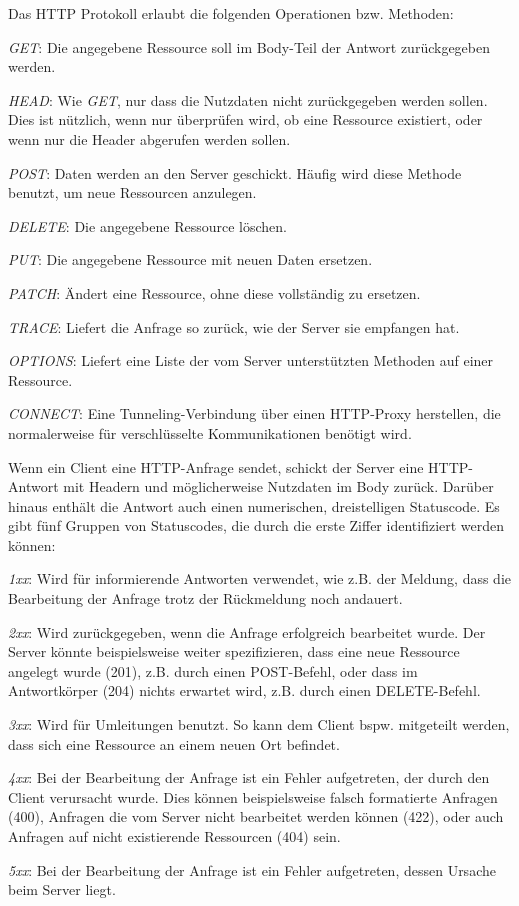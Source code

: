 Das HTTP Protokoll erlaubt die folgenden Operationen bzw. Methoden:

\begin{description}
	\item \emph{GET}: Die angegebene Ressource soll im Body-Teil der Antwort zurückgegeben werden.
	\item \emph{HEAD}: Wie \emph{GET}, nur dass die Nutzdaten nicht zurückgegeben werden sollen. Dies ist nützlich, wenn nur überprüfen wird, ob eine Ressource existiert, oder wenn nur die Header abgerufen werden sollen.
	\item \emph{POST}: Daten werden an den Server geschickt. Häufig wird diese Methode benutzt, um neue Ressourcen anzulegen.
	\item \emph{DELETE}: Die angegebene Ressource löschen.
	\item \emph{PUT}: Die angegebene Ressource mit neuen Daten ersetzen.
	\item \emph{PATCH}: Ändert eine Ressource, ohne diese vollständig zu ersetzen.
	\item \emph{TRACE}: Liefert die Anfrage so zurück, wie der Server sie empfangen hat.
	\item \emph{OPTIONS}: Liefert eine Liste der vom Server unterstützten Methoden auf einer Ressource.
	\item \emph{CONNECT}: Eine Tunneling-Verbindung über einen HTTP-Proxy herstellen, die normalerweise für verschlüsselte Kommunikationen benötigt wird.
\end{description}

Wenn ein Client eine HTTP-Anfrage sendet, schickt der Server eine HTTP-Antwort mit Headern und möglicherweise Nutzdaten im Body zurück. Darüber hinaus enthält die Antwort auch einen numerischen, dreistelligen Statuscode. Es gibt fünf Gruppen von Statuscodes, die durch die erste Ziffer identifiziert werden können:

\begin{description}
	\item \emph{1xx}: Wird für informierende Antworten verwendet, wie z.B. der Meldung, dass die Bearbeitung der Anfrage trotz der Rückmeldung noch andauert.
	\item \emph{2xx}: Wird zurückgegeben, wenn die Anfrage erfolgreich bearbeitet wurde. Der Server könnte beispielsweise weiter spezifizieren, dass eine neue Ressource angelegt wurde (201), z.B. durch einen POST-Befehl, oder dass im Antwortkörper (204) nichts erwartet wird, z.B. durch einen DELETE-Befehl.
	\item \emph{3xx}: Wird für Umleitungen benutzt. So kann dem Client bspw. mitgeteilt werden, dass sich eine Ressource an einem neuen Ort befindet.
	\item \emph{4xx}: Bei der Bearbeitung der Anfrage ist ein Fehler aufgetreten, der durch den Client verursacht wurde. Dies können beispielsweise falsch formatierte Anfragen (400), Anfragen die vom Server nicht bearbeitet werden können (422), oder auch Anfragen auf nicht existierende Ressourcen (404) sein.
	\item \emph{5xx}: Bei der Bearbeitung der Anfrage ist ein Fehler aufgetreten, dessen Ursache beim Server liegt. 
\end{description}


